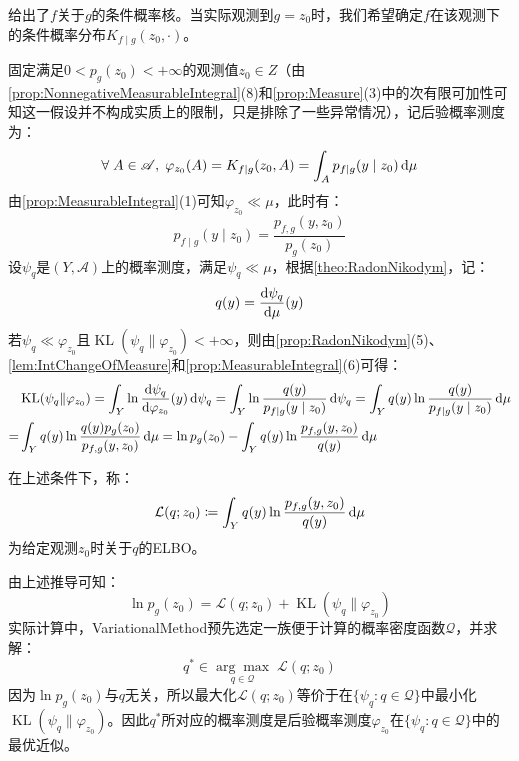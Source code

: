 给出了$f$关于$g$的条件概率核。当实际观测到$g=z_0$时，我们希望确定$f$在该观测下的条件概率分布$K_{f\mid g}(z_0,\cdot)$。\par
固定满足$0<p_g(z_0)<+\infty$的观测值$z_0\in Z$（由\cref{prop:NonnegativeMeasurableIntegral}(8)和\cref{prop:Measure}(3)中的次有限可加性可知这一假设并不构成实质上的限制，只是排除了一些异常情况），记后验概率测度为：
\begin{equation*}
	\forall\;A\in\mathscr{A},\;\varphi_{z_0}(A)=K_{f\mid g}(z_0,A)
	=\int_{A}p_{f\mid g}(y\mid z_0)\mathop{}\!\mathrm{d}\mu
\end{equation*}
由\cref{prop:MeasurableIntegral}(1)可知$\varphi_{z_0}\ll\mu$，此时有：
\begin{equation*}
	p_{f\mid g}(y\mid z_0)=\frac{p_{f,g}(y,z_0)}{p_g(z_0)}
\end{equation*}
设$\psi_q$是$(Y,\mathscr{A})$上的概率测度，满足$\psi_q\ll\mu$，根据\cref{theo:RadonNikodym}，记：
\begin{equation*}
	q(y)=\dfrac{\mathop{}\!\mathrm{d}\psi_q}{\mathop{}\!\mathrm{d}\mu}(y)
\end{equation*}
若$\psi_q\ll\varphi_{z_0}$且$\operatorname{KL}(\psi_q\|\varphi_{z_0})<+\infty$，则由\cref{prop:RadonNikodym}(5)、\cref{lem:IntChangeOfMeasure}和\cref{prop:MeasurableIntegral}(6)可得：
\begin{align*}
	&\operatorname{KL}(\psi_q\|\varphi_{z_0})=\int_{Y}\ln\frac{\mathop{}\!\mathrm{d}\psi_q}{\mathop{}\!\mathrm{d}\varphi_{z_0}}(y)\mathop{}\!\mathrm{d}\psi_q=\int_{Y}\ln\frac{q(y)}{p_{f\mid g}(y\mid z_0)}\mathop{}\!\mathrm{d}\psi_q=\int_{Y}q(y)\ln\frac{q(y)}{p_{f\mid g}(y\mid z_0)}\mathop{}\!\mathrm{d}\mu \\
	=&\int_{Y}q(y)\ln\frac{q(y)p_g(z_0)}{p_{f,g}(y,z_0)}\mathop{}\!\mathrm{d}\mu=\ln p_g(z_0)-\int_{Y}q(y)\ln\frac{p_{f,g}(y,z_0)}{q(y)}\mathop{}\!\mathrm{d}\mu
\end{align*}
\begin{definition}
	在上述条件下，称：
	\begin{equation*}
		\mathcal{L}(q;z_0)\coloneq\int_{Y}q(y)\ln\frac{p_{f,g}(y,z_0)}{q(y)}\mathop{}\!\mathrm{d}\mu
	\end{equation*}
	为给定观测$z_0$时关于$q$的\gls{ELBO}。
\end{definition}
由上述推导可知：
\begin{equation*}
	\ln p_g(z_0)=\mathcal{L}(q;z_0)+\operatorname{KL}(\psi_q\|\varphi_{z_0})
\end{equation*}
实际计算中，\gls{VariationalMethod}预先选定一族便于计算的概率密度函数$\mathscr{Q}$，并求解：
\begin{equation*}
	q^{*}\in\underset{q\in\mathscr{Q}}{\arg\max}\;\mathcal{L}(q;z_0)
\end{equation*}
因为$\ln p_g(z_0)$与$q$无关，所以最大化$\mathcal{L}(q;z_0)$等价于在$\{\psi_q:q\in\mathscr{Q}\}$中最小化$\operatorname{KL}(\psi_q\|\varphi_{z_0})$。因此$q^{*}$所对应的概率测度是后验概率测度$\varphi_{z_0}$在$\{\psi_q:q\in\mathscr{Q}\}$中的最优近似。

